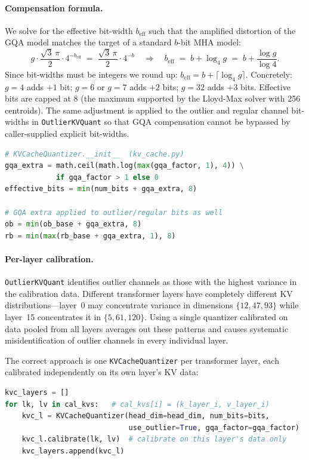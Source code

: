 \documentclass[11pt]{article}
\begin{document}
\paragraph{Compensation formula.}
We solve for the effective bit-width $b_{\mathrm{eff}}$ such that the
amplified distortion of the GQA model matches the target of a standard
$b$-bit MHA model:
\begin{equation}
  g \cdot \frac{\sqrt{3}\,\pi}{2} \cdot 4^{-b_{\mathrm{eff}}}
  \;=\; \frac{\sqrt{3}\,\pi}{2} \cdot 4^{-b}
  \quad\Rightarrow\quad
  b_{\mathrm{eff}} \;=\; b + \log_4 g \;=\; b + \frac{\log g}{\log 4}.
\end{equation}
Since bit-widths must be integers we round up:
$b_{\mathrm{eff}} = b + \lceil \log_4 g \rceil$.
Concretely: $g=4$ adds $+1$ bit; $g=6$ or $g=7$ adds $+2$ bits;
$g=32$ adds $+3$ bits. Effective bits are capped at 8 (the maximum supported
by the Lloyd-Max solver with 256 centroids). The same adjustment is applied
to the outlier and regular channel bit-widths in \texttt{OutlierKVQuant} so
that GQA compensation cannot be bypassed by caller-supplied explicit
bit-widths.

\begin{lstlisting}[language=Python]
# KVCacheQuantizer.__init__  (kv_cache.py)
gqa_extra = math.ceil(math.log(max(gqa_factor, 1), 4)) \
            if gqa_factor > 1 else 0
effective_bits = min(num_bits + gqa_extra, 8)

# GQA extra applied to outlier/regular bits as well
ob = min(ob_base + gqa_extra, 8)
rb = min(max(rb_base + gqa_extra, 1), 8)
\end{lstlisting}

\paragraph{Per-layer calibration.}
\texttt{OutlierKVQuant} identifies outlier channels as those with the
highest variance in the calibration data. Different transformer layers have
completely different KV distributions---layer~0 may concentrate variance in
dimensions $\{12, 47, 93\}$ while layer~15 concentrates it in
$\{5, 61, 120\}$. Using a single quantizer calibrated on data pooled from
all layers averages out these patterns and causes systematic misidentification
of outlier channels in every individual layer.

The correct approach is one \texttt{KVCacheQuantizer} per transformer layer,
each calibrated independently on its own layer's KV data:

\begin{lstlisting}[language=Python]
kvc_layers = []
for lk, lv in cal_kvs:   # cal_kvs[i] = (k_layer_i, v_layer_i)
    kvc_l = KVCacheQuantizer(head_dim=head_dim, num_bits=bits,
                             use_outlier=True, gqa_factor=gqa_factor)
    kvc_l.calibrate(lk, lv)  # calibrate on this layer's data only
    kvc_layers.append(kvc_l)
\end{lstlisting}
\end{document}
